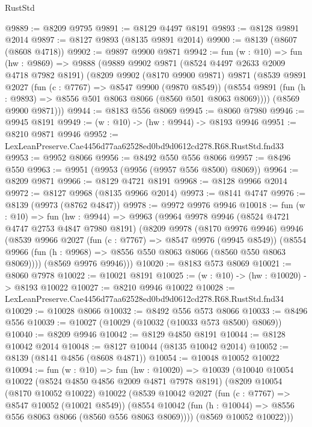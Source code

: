 \begin{lexlean}{RustStd}
\begin{coremodule}
@9889 := @8209 @9795
@9891 := @8129 @4497 @8191
@9893 := @8128 @9891 @2014
@9897 := @8127 @9893 (@8135 @9891 @2014)
@9900 := @8139 (@8607 (@8608 @4718))
@9902 := @9897 @9900 @9871
@9942 := fun (w : @10) =>
  fun (hw : @9869) =>
  @9888
    (@9889
      @9902
      @9871
      (@8524 @4497 @2633 @2009 @4718 @7982 @8191)
      (@8209
        @9902
        (@8170 @9900 @9871)
        @9871
        (@8539
          @9891
          @2027
          (fun (c : @7767) => @8547 @9900 (@9870 @8549))
          (@8554 @9891 (fun (h : @9893) => @8556 @501 @8063 @8066 (@8560 @501 @8063 @8069))))
        (@8569 @9900 @9871)))
@9944 := @8183 @556 @8069
@9945 := @8060 @7980
@9946 := @9945 @8191
@9949 := (w : @10) -> (hw : @9944) -> @8193 @9946
@9951 := @8210 @9871 @9946
@9952 := LexLeanPreserve.Cae4456d77aa62528ed0bd9d0612cd278.R68.RustStd.fnd33
@9953 := @9952 @8066
@9956 := @8492 @550 @556 @8066
@9957 := @8496 @550
@9963 := @9951 (@9953 (@9956 (@9957 @556 @8500) @8069))
@9964 := @8209 @9871
@9966 := @8129 @4721 @8191
@9968 := @8128 @9966 @2014
@9972 := @8127 @9968 (@8135 @9966 @2014)
@9973 := @8141 @4747
@9976 := @8139 (@9973 (@8762 @4847))
@9978 := @9972 @9976 @9946
@10018 := fun (w : @10) =>
  fun (hw : @9944) =>
  @9963
    (@9964
      @9978
      @9946
      (@8524 @4721 @4747 @2753 @4847 @7980 @8191)
      (@8209
        @9978
        (@8170 @9976 @9946)
        @9946
        (@8539
          @9966
          @2027
          (fun (c : @7767) => @8547 @9976 (@9945 @8549))
          (@8554 @9966 (fun (h : @9968) => @8556 @550 @8063 @8066 (@8560 @550 @8063 @8069))))
        (@8569 @9976 @9946)))
@10020 := @8183 @573 @8069
@10021 := @8060 @7978
@10022 := @10021 @8191
@10025 := (w : @10) -> (hw : @10020) -> @8193 @10022
@10027 := @8210 @9946 @10022
@10028 := LexLeanPreserve.Cae4456d77aa62528ed0bd9d0612cd278.R68.RustStd.fnd34
@10029 := @10028 @8066
@10032 := @8492 @556 @573 @8066
@10033 := @8496 @556
@10039 := @10027 (@10029 (@10032 (@10033 @573 @8500) @8069))
@10040 := @8209 @9946
@10042 := @8129 @4850 @8191
@10044 := @8128 @10042 @2014
@10048 := @8127 @10044 (@8135 @10042 @2014)
@10052 := @8139 (@8141 @4856 (@8608 @4871))
@10054 := @10048 @10052 @10022
@10094 := fun (w : @10) =>
  fun (hw : @10020) =>
  @10039
    (@10040
      @10054
      @10022
      (@8524 @4850 @4856 @2009 @4871 @7978 @8191)
      (@8209
        @10054
        (@8170 @10052 @10022)
        @10022
        (@8539
          @10042
          @2027
          (fun (c : @7767) => @8547 @10052 (@10021 @8549))
          (@8554 @10042 (fun (h : @10044) => @8556 @556 @8063 @8066 (@8560 @556 @8063 @8069))))
        (@8569 @10052 @10022)))

\end{coremodule}
\end{lexlean}
